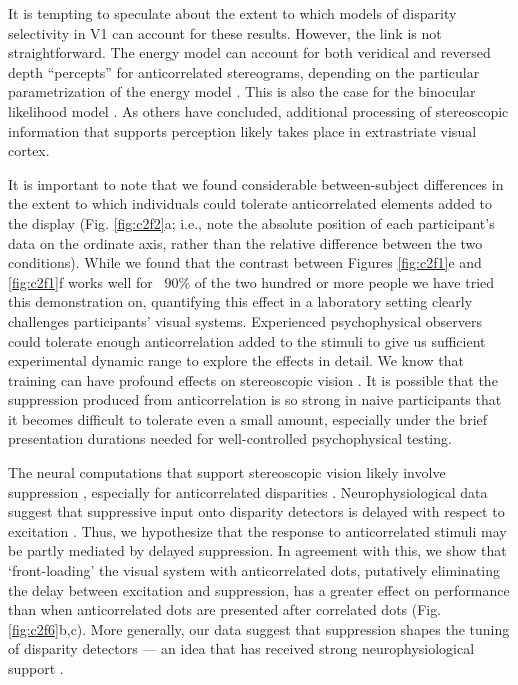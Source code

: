 It is tempting to speculate about the extent to which models of disparity selectivity in V1 can account for these results. However, the link is not straightforward. The energy model can account for both veridical and reversed depth ``percepts'' for anticorrelated stereograms, depending on the particular parametrization of the energy model \cite{Read:2002kx,Henriksen_2016}. This is also the case for the binocular likelihood model \cite{Goncalves:2017aa}. As others have concluded\cite{Cumming:1998ib,Janssen:2003fk}, additional processing of stereoscopic information that supports perception likely takes place in extrastriate visual cortex.

It is important to note that we found considerable between-subject differences in the extent to which individuals could tolerate anticorrelated elements added to the display (Fig. \ref{fig:c2f2}a; i.e., note the absolute position of each participant's data on the ordinate axis, rather than the relative difference between the two conditions). While we found that the contrast between Figures \ref{fig:c2f1}e and \ref{fig:c2f1}f works well for ~90\% of the two hundred or more people we have tried this demonstration on, quantifying this effect in a laboratory setting clearly challenges participants' visual systems. Experienced psychophysical observers could tolerate enough anticorrelation added to the stimuli to give us sufficient experimental dynamic range to explore the effects in detail. We know that training can have profound effects on stereoscopic vision \cite{Chowdhury:2008aa,Chang:2014ns}. It is possible that the suppression produced from anticorrelation is so strong in naive participants that it becomes difficult to tolerate even a small amount, especially under the brief presentation durations needed for well-controlled psychophysical testing.

The neural computations that support stereoscopic vision likely involve suppression \cite{Goncalves:2017aa,Samonds:2013cs,Haefner:2008jg,Burge:2014qj,Jaini158741}, especially for anticorrelated disparities \cite{Goncalves:2017aa}. Neurophysiological data suggest that suppressive input onto disparity detectors is delayed with respect to excitation \cite{Tanabe:2014ud}. Thus, we hypothesize that the response to anticorrelated stimuli may be partly mediated by delayed suppression. In agreement with this, we show that `front-loading' the visual system with anticorrelated dots, putatively eliminating the delay between excitation and suppression, has a greater effect on performance than when anticorrelated dots are presented after correlated dots (Fig. \ref{fig:c2f6}b,c). More generally, our data suggest that suppression shapes the tuning of disparity detectors --- an idea that has received strong neurophysiological support \cite{Tanabe:2011pt,Tanabe:2014ud,Nieder:2001jl}.

